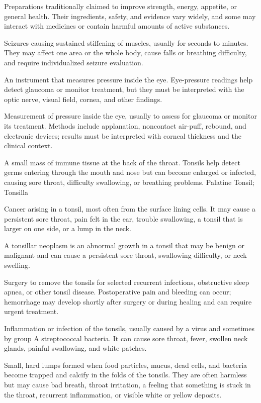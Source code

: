  Preparations traditionally claimed to improve strength, energy, appetite, or general health. Their ingredients, safety, and evidence vary widely, and some may interact with medicines or contain harmful amounts of active substances.

 Seizures causing sustained stiffening of muscles, usually for seconds to minutes. They may affect one area or the whole body, cause falls or breathing difficulty, and require individualized seizure evaluation.

 An instrument that measures pressure inside the eye. Eye-pressure readings help detect glaucoma or monitor treatment, but they must be interpreted with the optic nerve, visual field, cornea, and other findings.

 Measurement of pressure inside the eye, usually to assess for glaucoma or monitor its treatment. Methods include applanation, noncontact air-puff, rebound, and electronic devices; results must be interpreted with corneal thickness and the clinical context.

 A small mass of immune tissue at the back of the throat. Tonsils help detect germs entering through the mouth and nose but can become enlarged or infected, causing sore throat, difficulty swallowing, or breathing problems.
\synonyms
Palatine Tonsil; Tonsilla

 Cancer arising in a tonsil, most often from the surface lining cells. It may cause a persistent sore throat, pain felt in the ear, trouble swallowing, a tonsil that is larger on one side, or a lump in the neck.

 A tonsillar neoplasm is an abnormal growth in a tonsil that may be benign or malignant and can cause a persistent sore throat, swallowing difficulty, or neck swelling.

 Surgery to remove the tonsils for selected recurrent infections, obstructive
sleep apnea, or other tonsil disease. Postoperative pain and bleeding can occur; hemorrhage may develop
shortly after surgery or during healing and can require urgent treatment.

 Inflammation or infection of the tonsils, usually caused by a virus and sometimes by group A streptococcal bacteria. It can cause sore throat, fever, swollen neck glands, painful swallowing, and white patches.

 Small, hard lumps formed when food particles, mucus, dead cells, and bacteria become trapped and calcify in the folds of the tonsils. They are often harmless but may cause bad breath, throat irritation, a feeling that something is stuck in the throat, recurrent inflammation, or visible white or yellow deposits.

